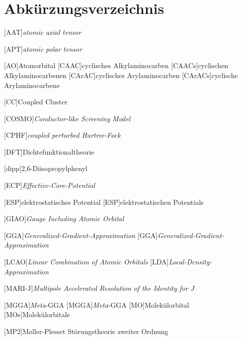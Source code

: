  {}
\renewcommand\refname{Abkürzungsverzeichnis} \chapter*{Abkürzungsverzeichnis}
\begin{acronym}[SEPSEP] %
    \setlength{\itemsep}{0.2cm} %
    
    [AAT]{\textit{atomic axial tensor}}
    
    [APT]{\textit{atomic polar tensor}}
    
    [AO]{Atomorbital}
	[CAAC]{cyclisches Alkylaminocarben}   
		[CAACs]{cyclischen Alkylaminocarbenen}
	[CArAC]{cyclisches Arylaminocarben}
		[CArACs]{cyclische Arylaminocarbene}
		
    [CC]{Coupled Cluster}		
		
 	[COSMO]{\textit{Conductor-like Screening Model}}
 	
	[CPHF]{\textit{coupled perturbed Hartree-Fock}}
 	
    [DFT]{Dichtefunktionaltheorie}
    
    [dipp]{2,6-Diisopropylphenyl}
    
    [ECP]{\textit{Effective-Core-Potential}}
    
    [ESP]{elektrostatisches Potential}
	    [ESP]{elektrostatischen Potentials}
	
	[GIAO]{\textit{Gauge Including Atomic Orbital}}    

	[GGA]{\textit{Generalized-Gradient-Approximation}}   
		[GGA]{\textit{Generalized-Gradient-Approximation}}
		
	[LCAO]{\textit{Linear Combination of Atomic Orbitals}}
	[LDA]{\textit{Local-Density-Approximation}}
     
    [MARI-J]{\textit{Multipole Accelerated Resolution of the Identity for $J$}} 	
 	
	[MGGA]{\textit{Meta}-GGA}   
		{\textit{Meta}-GGA}	
	[MO]{Molekülorbital}   
		[MOs]{Molekülorbitale}
		
	[MP2]{M\o ller-Plesset Störungstheorie zweiter Ordnung}
		

\end{acronym}
